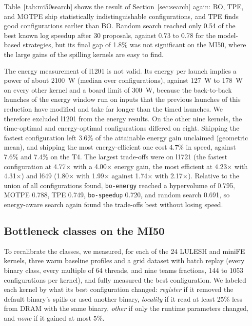 \documentclass[10pt]{article}
\newcommand{\x}{\ensuremath{\times}}
\newcommand{\code}[1]{\texttt{#1}}
\begin{document}
Table~\ref{tab:mi50search} shows the result of Section~\ref{sec:search} again:
BO, TPE, and MOTPE ship statistically indistinguishable configurations, and TPE
finds good configurations earlier than BO. Random search reached only 0.54 of
the best known log speedup after 30 proposals, against 0.73 to 0.78 for the
model-based strategies, but its final gap of 1.8\% was not significant on the
MI50, where the large gains of the spilling kernels are easy to find.

The energy measurement of l1201 is not valid. Its energy per launch implies a
power of about 2100~W (median over configurations), against 127~W to 178~W on
every other kernel and a board limit of 300~W, because the back-to-back launches
of the energy window run on inputs that the previous launches of this reduction
have modified and take far longer than the timed launches. We therefore
excluded l1201 from the energy results. On the other nine kernels, the
time-optimal and energy-optimal configurations differed on eight. Shipping the
fastest configuration left 3.6\% of the attainable energy gain unclaimed
(geometric mean), and shipping the most energy-efficient one cost 4.7\% in
speed, against 7.6\% and 7.4\% on the T4. The largest trade-offs were on l1721
(the fastest configuration at 4.77\x{} with a 4.00\x{} energy gain, the most
efficient at 4.23\x{} with 4.31\x{}) and l649 (1.80\x{} with 1.99\x{} against
1.74\x{} with 2.17\x{}). Relative to the union of all configurations found,
\code{bo-energy} reached a hypervolume of 0.795, MOTPE 0.788, TPE 0.749,
\code{bo-speedup} 0.720, and random search 0.691, so energy-aware search again
found the trade-offs best without losing speed.

\subsection{Bottleneck classes on the MI50}
\label{sec:amd-classes}
To recalibrate the classes, we measured, for each of the 24 LULESH and miniFE
kernels, three warm baseline profiles and a grid dataset with batch replay (every
binary class, every multiple of 64 threads, and nine teams fractions, 144 to
1053 configurations per kernel), and fully measured the best configuration. We
labeled each kernel by what its best configuration changed: \emph{register} if
it removed the default binary's spills or used another binary, \emph{locality}
if it read at least 25\% less from DRAM with the same binary, \emph{other} if
only the runtime parameters changed, and \emph{none} if it gained at most 5\%.
\end{document}
